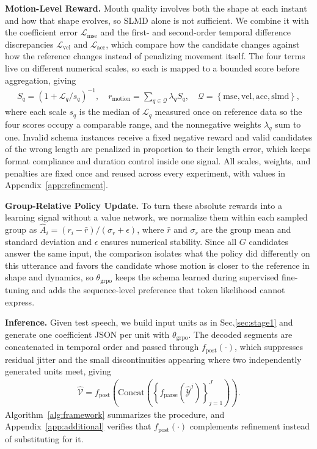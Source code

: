 \noindent\textbf{Motion-Level Reward.}\quad
Mouth quality involves both the shape at each instant and how that shape evolves, so SLMD alone is not sufficient. We combine it with the coefficient error $\mathcal{L}_{\mathrm{mse}}$ and the first- and second-order temporal difference discrepancies $\mathcal{L}_{\mathrm{vel}}$ and $\mathcal{L}_{\mathrm{acc}}$, which compare how the candidate changes against how the reference changes instead of penalizing movement itself. The four terms live on different numerical scales, so each is mapped to a bounded score before aggregation, giving
\begin{align}
    S_{q}=\left(1+\mathcal{L}_{q}/s_{q}\right)^{-1},\quad
    r_{\mathrm{motion}}=\sum_{q\in\mathcal{Q}}\lambda_{q}S_{q},\quad \mathcal{Q}=\left\{\mathrm{mse},\mathrm{vel},\mathrm{acc},\mathrm{slmd}\right\}, \label{eq:reward}
\end{align}
where each scale $s_{q}$ is the median of $\mathcal{L}_{q}$ measured once on reference data so the four scores occupy a comparable range, and the nonnegative weights $\lambda_{q}$ sum to one. Invalid schema instances receive a fixed negative reward and valid candidates of the wrong length are penalized in proportion to their length error, which keeps format compliance and duration control inside one signal. All scales, weights, and penalties are fixed once and reused across every experiment, with values in Appendix~\ref{app:refinement}.

\noindent\textbf{Group-Relative Policy Update.}\quad
To turn these absolute rewards into a learning signal without a value network, we normalize them within each sampled group as $\hat{A}_{i}=(r_{i}-\bar{r})/(\sigma_{r}+\epsilon)$, where $\bar{r}$ and $\sigma_{r}$ are the group mean and standard deviation and $\epsilon$ ensures numerical stability. Since all $G$ candidates answer the same input, the comparison isolates what the policy did differently on this utterance and favors the candidate whose motion is closer to the reference in shape and dynamics, so $\theta_{\mathrm{grpo}}$ keeps the schema learned during supervised fine-tuning and adds the sequence-level preference that token likelihood cannot express.

\noindent\textbf{Inference.}\quad
Given test speech, we build input units as in Sec.\ref{sec:stage1} and generate one coefficient JSON per unit with $\theta_{\mathrm{grpo}}$. The decoded segments are concatenated in temporal order and passed through $f_{\mathrm{post}}(\cdot)$, which suppresses residual jitter and the small discontinuities appearing where two independently generated units meet, giving
\begin{gather}
    \hat{\mathcal{V}}=f_{\mathrm{post}}\!\left(\mathrm{Concat}\!\left(\left\{f_{\mathrm{parse}}\!\left(\hat{\mathcal{Y}}^{j}\right)\right\}_{j=1}^{J}\right)\right). \label{eq:infer}
\end{gather}
Algorithm~\ref{alg:framework} summarizes the procedure, and Appendix~\ref{app:additional} verifies that $f_{\mathrm{post}}(\cdot)$ complements refinement instead of substituting for it.
